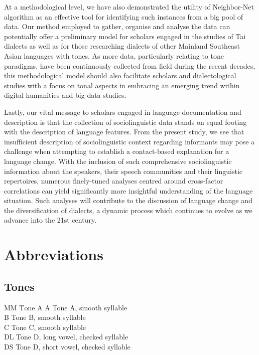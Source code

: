 \documentclass[output=paper]{langscibook}
\begin{document}
At a methodological level, we have also demonstrated the utility of Neighbor-Net algorithm as an effective tool for identifying such instances from a big pool of data. Our method employed to gather, organise and analyse the data can potentially offer a preliminary model for scholars engaged in the studies of Tai dialects as well as for those researching dialects of other Mainland Southeast Asian languages with tones. As more data, particularly relating to tone paradigms, have been continuously collected from field during the recent decades, this methodological model should also facilitate scholars and dialectological studies with a focus on tonal aspects in embracing an emerging trend within digital humanities and big data studies.

Lastly, our vital message to scholars engaged in language documentation and description is that the collection of sociolinguistic data stands on equal footing with the description of language features. From the present study, we see that insufficient description of sociolinguistic context regarding informants may pose a challenge when attempting to establish a contact-based explanation for a language change. With the inclusion of such comprehensive sociolinguistic information about the speakers, their speech communities and their linguistic repertoires, numerous finely-tuned analyses centred around cross-factor correlations can yield significantly more insightful understanding of the language situation. Such analyses will contribute to the discussion of language change and the diversification of dialects, a dynamic process which continues to evolve as we advance into the 21st century.

\section*{Abbreviations}

\subsection*{Tones}
\begin{tabbing}
MM \= Tone A\kill
A  \> Tone A, smooth syllable\\ 
B  \> Tone B, smooth syllable\\ 
C  \> Tone C, smooth syllable\\
DL \> Tone D, long vowel, checked syllable\\ 
DS \> Tone D, short vowel, checked syllable
\end{tabbing}
\end{document}
